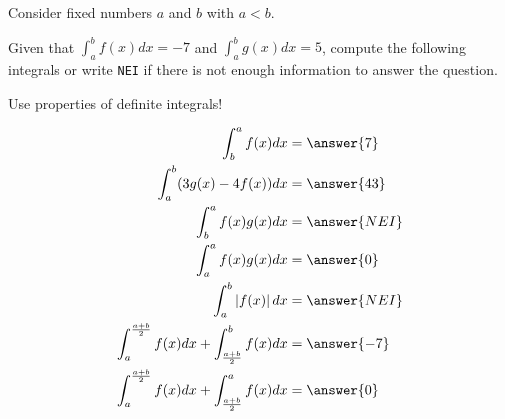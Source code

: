 \documentclass{ximera}
\author{Nela Lakos \and Kyle Parsons}
\begin{document}
\begin{exercise}

Consider fixed numbers $a$ and $b$ with $a<b$.

 Given that $\int_a^b f(x) dx = -7$ and $\int_a^b g(x) dx = 5$, compute the following integrals or write \verb|NEI| if there is not enough information to answer the question.
\begin{hint}
Use properties of  definite integrals!
\end{hint}
\begin{align*}
\int_b^a f(x) dx &= \answer{7}\\
\int_a^b (3g(x) - 4f(x)) dx &= \answer{43}\\
\int_b^a f(x)g(x) dx &= \answer{NEI}\\
\int_a^a f(x)g(x) dx &= \answer{0}\\
\int_a^b \left|f(x)\right| dx &= \answer{NEI}\\
\int_a^{\frac{a+b}{2}} f(x) dx + \int_{\frac{a+b}{2}}^b f(x) dx &= \answer{-7}\\
\int_a^{\frac{a+b}{2}} f(x) dx + \int_{\frac{a+b}{2}}^a f(x) dx &= \answer{0}\\
\end{align*}

\end{exercise}
\end{document}
